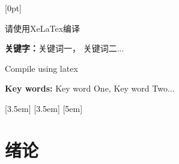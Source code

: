 \documentclass{ctexart}
\numberwithin{figure}{section}
\numberwithin{table}{section}
\numberwithin{equation}{section}
\begin{document}
\hypersetup{hidelinks}

[0pt]{\addvspace{5pt}\filright}              
{\contentspush{\thecontentslabel\ }} 
{}{\contentspage}


\begin{cnabstract}
请使用XeLaTex编译
	
\textbf{ \heiti 关键字：}{\heiti 关键词一， 关键词二...}
\end{cnabstract}
\newpage
\begin{enabstract}[Abstract]
Compile using latex

\textbf{ Key words:} Key word One, Key word Two...
\end{enabstract}

\newpage


[3.5em]{\bf \heiti {} \linespread{1.5}}
{\contentslabel{3.5em}}{}{\titlerule*[0.5pc]{$\cdot$}\contentspage}
[3.5em]{\songti {} \linespread{1.5}}
{\contentslabel{2em}}{}{\titlerule*[0.5pc]{$\cdot$}\contentspage}
[5em]{\songti {} \linespread{1.5}}
{\contentslabel{2.5em}}{}{\titlerule*[0.5pc]{$\cdot$}\contentspage}

\tableofcontents
\newpage
{}
\setcounter{page}{1}

\fancyhf{}
\fancyfoot[L]{}
\fancyfoot[R]{}
\renewcommand{\headrulewidth}{0.5pt}


\section{绪论}
\end{document}
